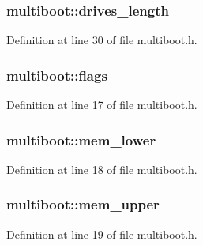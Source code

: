 \subsubsection[{\texorpdfstring{drives\+\_\+length}{drives_length}}]{ multiboot\+::drives\+\_\+length}\hypertarget{structmultiboot_aa7b0c3190c16b960f5149c022bb2c22f}{}\label{structmultiboot_aa7b0c3190c16b960f5149c022bb2c22f}


Definition at line 30 of file multiboot.\+h.

\subsubsection[{\texorpdfstring{flags}{flags}}]{ multiboot\+::flags}\hypertarget{structmultiboot_aa9c5426efeb4263ba260453ae8a83766}{}\label{structmultiboot_aa9c5426efeb4263ba260453ae8a83766}


Definition at line 17 of file multiboot.\+h.

\subsubsection[{\texorpdfstring{mem\+\_\+lower}{mem_lower}}]{ multiboot\+::mem\+\_\+lower}\hypertarget{structmultiboot_a0c2b38f61acbb8bce9a3816bea3dceb0}{}\label{structmultiboot_a0c2b38f61acbb8bce9a3816bea3dceb0}


Definition at line 18 of file multiboot.\+h.

\subsubsection[{\texorpdfstring{mem\+\_\+upper}{mem_upper}}]{ multiboot\+::mem\+\_\+upper}\hypertarget{structmultiboot_a914ffaeaee2f44eea822a3808f6bfc44}{}\label{structmultiboot_a914ffaeaee2f44eea822a3808f6bfc44}


Definition at line 19 of file multiboot.\+h.

